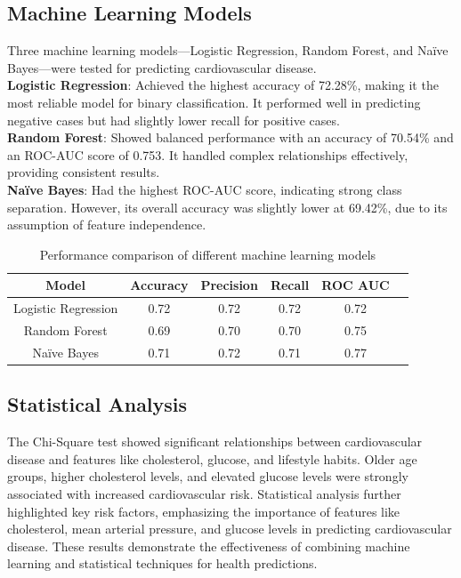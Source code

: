 \documentclass[12pt]{article}
\begin{document}
\subsection{Machine Learning Models}
Three machine learning models—Logistic Regression, Random Forest, and Naïve Bayes—were tested for predicting cardiovascular disease. \\
\textbf{Logistic Regression}: Achieved the highest accuracy of 72.28\%, making it the most reliable model for binary classification. It performed well in predicting negative cases but had slightly lower recall for positive cases.\\
\textbf{Random Forest}: Showed balanced performance with an accuracy of 70.54\% and an ROC-AUC score of 0.753. It handled complex relationships effectively, providing consistent results.\\
\textbf{Naïve Bayes}: Had the highest ROC-AUC score, indicating strong class separation. However, its overall accuracy was slightly lower at 69.42\%, due to its assumption of feature independence.

\begin{table}[ht!]
\centering
\begin{tabular}{|c|c|c|c|c|c|}
\hline
\textbf{Model} & \textbf{Accuracy} & \textbf{Precision} & \textbf{Recall} & \textbf{ROC AUC} \\ \hline
Logistic Regression & 0.72 & 0.72 & 0.72 & 0.72  \\ \hline
Random Forest & 0.69 & 0.70 & 0.70 & 0.75 \\ \hline
Naïve Bayes & 0.71 & 0.72 & 0.71 & 0.77 \\ \hline

\end{tabular}
\caption{Performance comparison of different machine learning models}
\end{table}
\subsection{Statistical Analysis}

The Chi-Square test showed significant relationships between cardiovascular disease and features like cholesterol, glucose, and lifestyle habits.
Older age groups, higher cholesterol levels, and elevated glucose levels were strongly associated with increased cardiovascular risk. Statistical analysis further highlighted key risk factors, emphasizing the importance of features like cholesterol, mean arterial pressure, and glucose levels in predicting cardiovascular disease. These results demonstrate the effectiveness of combining machine learning and statistical techniques for health predictions.
\end{document}
